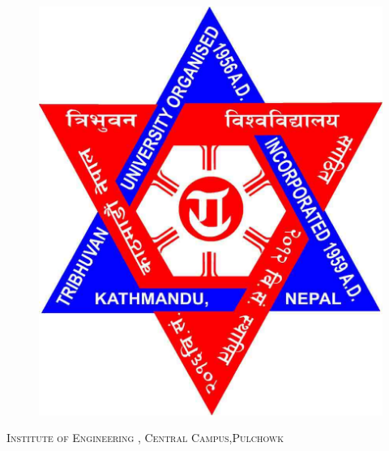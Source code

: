 \documentclass[a4paper,12pt]{article}
\begin{document}



\begin{titlepage} %

	\begin{figure}[H]
	\centering	
	\includegraphics[scale=0.2]{tulogo.jpg} 
	\end{figure}
	
	\center %
	
	\textsc{\LARGE Institute of Engineering , Central Campus,Pulchowk}\\[1.5cm] %
	
	

\end{titlepage}
\end{document}
